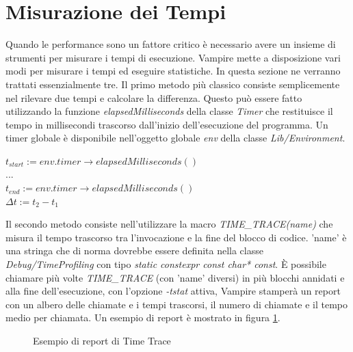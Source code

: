 \documentclass[./main.tex]{subfiles}
\begin{document}
\section{Misurazione dei Tempi} \label{sec:vampire_time}
Quando le performance sono un fattore critico è necessario avere un insieme di strumenti per misurare i tempi di esecuzione.
Vampire mette a disposizione vari modi per misurare i tempi ed eseguire statistiche. In questa sezione ne verranno trattati essenzialmente tre.
Il primo metodo più classico consiste semplicemente nel rilevare due tempi e calcolare la differenza.
Questo può essere fatto utilizzando la funzione \textit{elapsedMilliseconds} della classe \textit{Timer} 
che restituisce il tempo in millisecondi trascorso dall'inizio dell'esecuzione del programma. 
Un timer globale è disponibile nell'oggetto globale \textit{env} della classe \textit{Lib/Environment}.

$t_{start} := env.timer{\rightarrow}elapsedMilliseconds()$ \\
... \\
$t_{end} := env.timer{\rightarrow}elapsedMilliseconds()$ \\
$\Delta t := t_2 - t_1$

Il secondo metodo consiste nell'utilizzare la macro \textit{TIME\_TRACE(name)}
che misura il tempo trascorso tra l'invocazione e la fine del blocco di codice.
'name' è una stringa che di norma dovrebbe essere definita nella classe \textit{Debug/TimeProfiling} con tipo
\textit{static constexpr const char* const}.
È possibile chiamare più volte \textit{TIME\_TRACE} (con 'name' diversi) in più blocchi annidati e alla fine dell'esecuzione, con l'opzione \textit{-tstat} attiva,
Vampire stamperà un report con un albero delle chiamate e i tempi trascorsi, il numero di chiamate e il tempo medio per chiamata.
Un esempio di report è mostrato in figura \ref{fig:time_trace_report}.

\begin{figure}[h]
    \centering
    \caption{Esempio di report di Time Trace}
    \label{fig:time_trace_report}
\end{figure}
\end{document}
